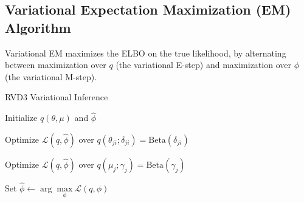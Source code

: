 \documentclass[11pt,reqno]{amsart}
\begin{document}
\subsection{Variational Expectation Maximization (EM) Algorithm}
Variational EM maximizes the ELBO on the true likelihood, by alternating between maximization over $q$ (the variational E-step) and maximization over $\phi$ (the variational M-step).

\begin{algorithm}[ht]
  \caption{RVD3 Variational Inference}

  \begin{algorithmic}[1]

  \State Initialize $ q(\theta, \mu) $ and $\hat{\phi}$

  \Repeat

	\Repeat
	
			\State Optimize $\mathcal{L}(q, \hat{\phi})$ over $q(\theta_{ji}; \delta_{ji}) = \text{Beta} (\delta_{ji})$				
			\EndFor			
		\EndFor
		
	
			\State Optimize $\mathcal{L}(q, \hat{\phi})$ over $q(\mu_j; \gamma_j) = \text{Beta} (\gamma_j)$			
		\EndFor
	

  \State Set $\hat{\phi} \leftarrow \arg \max\limits_{\phi}
            \mathcal{L}(q,\phi)$

  \end{algorithmic}

\end{algorithm}



\appendix

%
%
\end{document}
